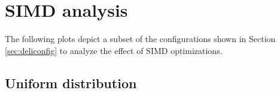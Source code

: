 \documentclass{article}
\begin{document}


\section{SIMD analysis}
The following plots depict a subset of the configurations shown in Section \ref{sec:deliconfig} to analyze the effect of SIMD optimizations.

\subsection{Uniform distribution}
\end{document}
